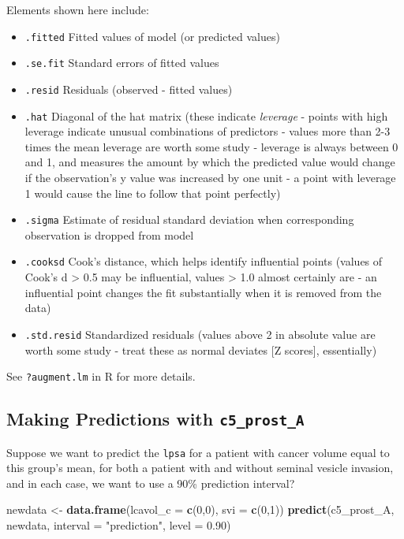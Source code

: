 \documentclass[]{book}
\newenvironment{Shaded}{\begin{snugshade}}{\end{snugshade}}
\newcommand{\KeywordTok}[1]{\textcolor[rgb]{0.13,0.29,0.53}{\textbf{#1}}}
\newcommand{\DataTypeTok}[1]{\textcolor[rgb]{0.13,0.29,0.53}{#1}}
\newcommand{\DecValTok}[1]{\textcolor[rgb]{0.00,0.00,0.81}{#1}}
\newcommand{\FloatTok}[1]{\textcolor[rgb]{0.00,0.00,0.81}{#1}}
\newcommand{\StringTok}[1]{\textcolor[rgb]{0.31,0.60,0.02}{#1}}
\newcommand{\NormalTok}[1]{#1}
\providecommand{\tightlist}{%
  \setlength{\itemsep}{0pt}\setlength{\parskip}{0pt}}
\theoremstyle{definition}
\theoremstyle{definition}
\theoremstyle{definition}
\theoremstyle{remark}
\begin{document}
Elements shown here include:

\begin{itemize}
\tightlist
\item
  \texttt{.fitted} Fitted values of model (or predicted values)
\item
  \texttt{.se.fit} Standard errors of fitted values
\item
  \texttt{.resid} Residuals (observed - fitted values)
\item
  \texttt{.hat} Diagonal of the hat matrix (these indicate
  \emph{leverage} - points with high leverage indicate unusual
  combinations of predictors - values more than 2-3 times the mean
  leverage are worth some study - leverage is always between 0 and 1,
  and measures the amount by which the predicted value would change if
  the observation's y value was increased by one unit - a point with
  leverage 1 would cause the line to follow that point perfectly)
\item
  \texttt{.sigma} Estimate of residual standard deviation when
  corresponding observation is dropped from model
\item
  \texttt{.cooksd} Cook's distance, which helps identify influential
  points (values of Cook's d \textgreater{} 0.5 may be influential,
  values \textgreater{} 1.0 almost certainly are - an influential point
  changes the fit substantially when it is removed from the data)
\item
  \texttt{.std.resid} Standardized residuals (values above 2 in absolute
  value are worth some study - treat these as normal deviates {[}Z
  scores{]}, essentially)
\end{itemize}

See \texttt{?augment.lm} in R for more details.

\subsection{\texorpdfstring{Making Predictions with
\texttt{c5\_prost\_A}}{Making Predictions with c5\_prost\_A}}\label{making-predictions-with-c5_prost_a}

Suppose we want to predict the \texttt{lpsa} for a patient with cancer
volume equal to this group's mean, for both a patient with and without
seminal vesicle invasion, and in each case, we want to use a 90\%
prediction interval?

\begin{Shaded}
\begin{Highlighting}[]
\NormalTok{newdata <-}\StringTok{ }\KeywordTok{data.frame}\NormalTok{(}\DataTypeTok{lcavol_c =} \KeywordTok{c}\NormalTok{(}\DecValTok{0}\NormalTok{,}\DecValTok{0}\NormalTok{), }\DataTypeTok{svi =} \KeywordTok{c}\NormalTok{(}\DecValTok{0}\NormalTok{,}\DecValTok{1}\NormalTok{))}
\KeywordTok{predict}\NormalTok{(c5_prost_A, newdata, }\DataTypeTok{interval =} \StringTok{"prediction"}\NormalTok{, }\DataTypeTok{level =} \FloatTok{0.90}\NormalTok{)}
\end{Highlighting}
\end{Shaded}
\end{document}
